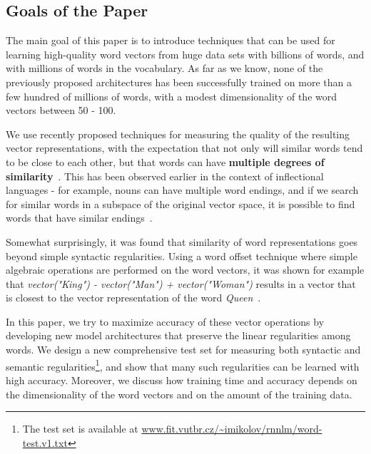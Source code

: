 \documentclass{article} %
\begin{document}

\subsection{Goals of the Paper}

The main goal of this paper is to introduce techniques that can be used for learning high-quality word vectors from huge data sets with billions of words, and with millions of words in the vocabulary.
As far as we know, none of the previously proposed architectures has been successfully trained on more than a few hundred of millions of words, with a modest dimensionality of the word vectors between 50 - 100.


We use recently proposed techniques for measuring the quality of the resulting vector representations, with the expectation that not only
will similar words tend to be close to each other, but that words can have {\bf multiple degrees of similarity}~\cite{NAACL1}. This has been observed earlier in the context of inflectional
languages - for example, nouns can have multiple word endings, and if we search for similar words in a subspace of the original vector space, it is possible to find words that have similar endings~\cite{dip, Mikolov}.

Somewhat surprisingly, it was found that similarity of word representations goes beyond simple syntactic regularities. Using a word offset technique where simple algebraic operations are performed on the
word vectors, it was shown for example that {\it vector("King") - vector("Man") + vector("Woman")} results in a vector that is closest to the vector representation of the word {\it Queen}~\cite{NAACL1}.

In this paper, we try to maximize accuracy of these vector operations by
developing new model architectures that preserve the linear regularities among words. We design a new comprehensive test set for measuring both
syntactic and semantic regularities\footnote{The test set is available at \url{www.fit.vutbr.cz/~imikolov/rnnlm/word-test.v1.txt}},
and show that many such regularities can be learned
with high accuracy. Moreover, we discuss how training time and accuracy depends on the dimensionality of the word vectors and on the amount of the training data.
\end{document}
